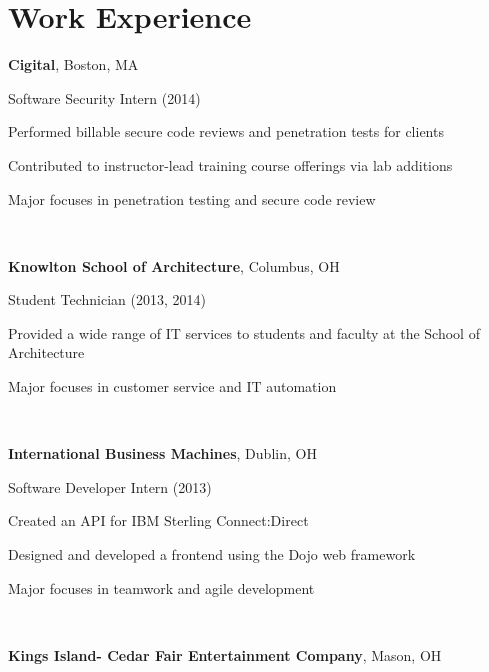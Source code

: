 \documentclass[letterpaper]{resume}
\begin{document}
\section{Work Experience}
\textbf{Cigital}, Boston, MA

Software Security Intern (2014)
\begin{compactitem}
\item Performed billable secure code reviews and penetration tests for clients

\item Contributed to instructor-lead training course offerings via lab
	additions

\item Major focuses in penetration testing and secure code review

\end{compactitem}

~

\textbf{Knowlton School of Architecture}, Columbus, OH

Student Technician (2013, 2014)
\begin{compactitem}
\item Provided a wide range of IT services to students and faculty at the
	School of Architecture


\item Major focuses in customer service and IT automation
\end{compactitem}

~

\textbf{International Business Machines}, Dublin, OH

Software Developer Intern (2013)
\begin{compactitem}
\item Created an API for IBM Sterling Connect:Direct

\item Designed and developed a frontend using the Dojo web framework


\item Major focuses in teamwork and agile development
\end{compactitem}

~

\textbf{Kings Island- Cedar Fair Entertainment Company}, Mason, OH
\end{document}
